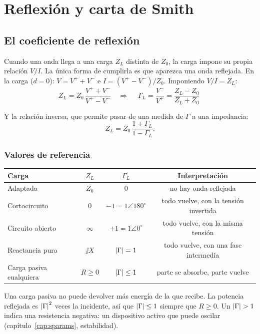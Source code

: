 \chapter{Reflexión y carta de Smith}\label{cap:smith}

\section{El coeficiente de reflexión}

Cuando una onda llega a una carga $Z_L$ distinta de $Z_0$, la carga impone su propia relación $V/I$. La única forma de cumplirla
es que aparezca una onda reflejada. En la carga ($d = 0$): $V = V^+ + V^-$ e $I = (V^+ - V^-)/Z_0$. Imponiendo $V/I = Z_L$:
\begin{equation}
  Z_L = Z_0\,\frac{V^+ + V^-}{V^+ - V^-} \quad\Longrightarrow\quad
  \boxed{\;\Gamma_L = \frac{V^-}{V^+} = \frac{Z_L - Z_0}{Z_L + Z_0}\;}
\end{equation}
\begin{donde}
\end{donde}
Y la relación inversa, que permite pasar de una medida de $\Gamma$ a una impedancia:
\begin{equation}
  Z_L = Z_0\,\frac{1 + \Gamma_L}{1 - \Gamma_L}.
\end{equation}

\subsection{Valores de referencia}
\begin{center}
\begin{tabular}{lccc}\toprule
Carga & $Z_L$ & $\Gamma_L$ & Interpretación \\ \midrule
Adaptada & $Z_0$ & $0$ & no hay onda reflejada \\
Cortocircuito & $0$ & $-1 = 1\angle 180^\circ$ & todo vuelve, con la tensión invertida \\
Circuito abierto & $\infty$ & $+1 = 1\angle 0^\circ$ & todo vuelve, con la misma tensión \\
Reactancia pura & $\jj X$ & $\left|\Gamma\right| = 1$ & todo vuelve, con una fase intermedia \\
Carga pasiva cualquiera & $R \ge 0$ & $\left|\Gamma\right| \le 1$ & parte se absorbe, parte vuelve \\ \bottomrule
\end{tabular}
\end{center}
\begin{intuicion}
Una carga pasiva no puede devolver más energía de la que recibe. La potencia reflejada es $\left|\Gamma\right|^2$ veces la incidente, así que
$\left|\Gamma\right|\le 1$ siempre que $R\ge0$. Un $\left|\Gamma\right| > 1$ indica una resistencia negativa: un dispositivo activo que puede oscilar
(capítulo~\ref{cap:sparams}, estabilidad).
\end{intuicion}

